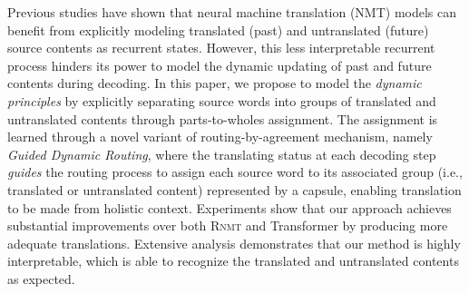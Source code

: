 Previous studies have shown that neural machine translation (NMT) models can benefit from explicitly modeling translated (past) and untranslated (future) source contents as recurrent states. However, this less interpretable recurrent process hinders its power to model the dynamic updating of past and future contents during decoding. In this paper, we propose to model the \textit{dynamic principles} by explicitly separating source words into groups of translated and untranslated contents through parts-to-wholes assignment. The assignment is learned through a novel variant of routing-by-agreement mechanism, namely {\em Guided Dynamic Routing}, where the translating status at each decoding step \textit{guides} the routing process to assign each source word to its associated group (i.e., translated or untranslated content)  represented by a capsule, enabling translation to be made from holistic context. Experiments show that our approach achieves substantial improvements over both \textsc{Rnmt} and Transformer by producing more adequate translations. Extensive analysis demonstrates that our method is highly interpretable, which is able to recognize the translated and untranslated contents as expected.
